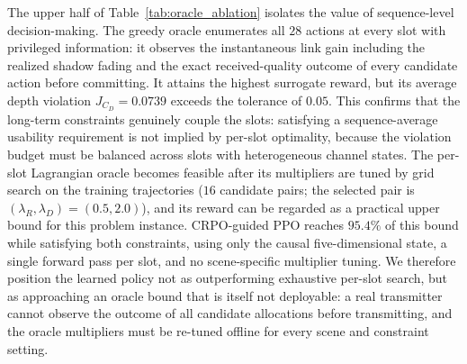 \documentclass[journal]{IEEEtran}
\begin{document}
The upper half of Table~\ref{tab:oracle_ablation} isolates the value of sequence-level decision-making. The greedy oracle enumerates all $28$ actions at every slot with privileged information: it observes the instantaneous link gain including the realized shadow fading and the exact received-quality outcome of every candidate action before committing. It attains the highest surrogate reward, but its average depth violation $J_{C_D}=0.0739$ exceeds the tolerance of $0.05$. This confirms that the long-term constraints genuinely couple the slots: satisfying a sequence-average usability requirement is not implied by per-slot optimality, because the violation budget must be balanced across slots with heterogeneous channel states. The per-slot Lagrangian oracle becomes feasible after its multipliers are tuned by grid search on the training trajectories ($16$ candidate pairs; the selected pair is $(\lambda_R,\lambda_D)=(0.5,2.0)$), and its reward can be regarded as a practical upper bound for this problem instance. CRPO-guided PPO reaches $95.4\%$ of this bound while satisfying both constraints, using only the causal five-dimensional state, a single forward pass per slot, and no scene-specific multiplier tuning. We therefore position the learned policy not as outperforming exhaustive per-slot search, but as approaching an oracle bound that is itself not deployable: a real transmitter cannot observe the outcome of all candidate allocations before transmitting, and the oracle multipliers must be re-tuned offline for every scene and constraint setting.
\end{document}
